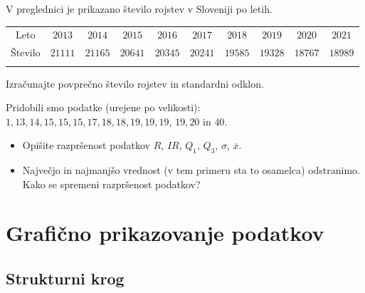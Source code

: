         \begin{naloga}
         
            V preglednici je prikazano število rojstev v Sloveniji po letih. 

             \begin{table}[H]
                 \centering
                 \begin{tabular}{||c|c|c|c|c|c|c|c|c|c||} 
                 \hhline{|t:==========:t|}
                 \rowcolor[rgb]{0.843,0.718,0.718} 
                 Leto   & $2013$ & $2014$ & $2015$ & $2016$ & $2017$ & $2018$ & $2019$ & $2020$ & $2021$    \\ 
                 \hhline{|:==========:|}
                 Število  & $21111$ & $21165$ & $20641$ & $20345$ & $20241$ & $19585$ & $19328$ & $18767$ & $18989$ \\ 
                 \hhline{|b:==========:b|}
                 \end{tabular}
             \end{table}

             Izračunajte povprečno število rojstev in standardni odklon.

        \end{naloga}


             \begin{naloga}
         
                Pridobili smo podatke (urejene po velikosti): $1, 13, 14, 15, 15, 15, 17, 18, 18, 19, 19, 19$, $19, 20$ in $40$.
                \begin{itemize}
                    \item Opišite razpršenost podatkov $R$, $IR$, $Q_1$, $Q_3$, $\sigma$, $\overline{x}$.
                    \item Največjo in najmanjšo vrednost (v tem primeru sta to osamelca) odstranimo. Kako se spremeni razpršenost podatkov? 
                \end{itemize}
                
            \end{naloga}
    
         
 

\newpage

    \section{Grafično prikazovanje podatkov}
                

            \subsection*{Strukturni krog}
            
